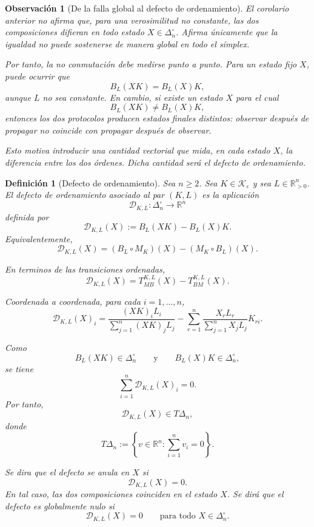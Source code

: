 \documentclass[12pt]{article}
\newtheorem{definicion}{Definición}[section]
\newtheorem{observacion}{Observación}[section]
\begin{document}
\begin{observacion}[De la falla global al defecto de ordenamiento]
El corolario anterior no afirma que, para una verosimilitud no constante, las dos composiciones difieran en todo estado \(X\in\Delta_n^\circ\). Afirma únicamente que la igualdad no puede sostenerse de manera global en todo el símplex.

Por tanto, la no conmutación debe medirse punto a punto. Para un estado fijo \(X\), puede ocurrir que
\[
B_L(XK)=B_L(X)K,
\]
aunque \(L\) no sea constante. En cambio, si existe un estado \(X\) para el cual
\[
B_L(XK)\neq B_L(X)K,
\]
entonces los dos protocolos producen estados finales distintos: observar después de propagar no coincide con propagar después de observar.

Esto motiva introducir una cantidad vectorial que mida, en cada estado \(X\), la diferencia entre los dos órdenes. Dicha cantidad será el defecto de ordenamiento.
\end{observacion}

\begin{definicion}[Defecto de ordenamiento]
\label{def:defecto_ordenamiento}
Sea \(n\ge 2\). Sea \(K\in\mathcal K_\varepsilon\) y sea \(L\in\mathbb R_{>0}^n\). El defecto de ordenamiento asociado al par \((K,L)\) es la aplicación
\[
\mathcal D_{K,L}:\Delta_n^\circ\longrightarrow \mathbb R^n
\]
definida por
\[
\mathcal D_{K,L}(X)
:=
B_L(XK)-B_L(X)K.
\]
Equivalentemente,
\[
\mathcal D_{K,L}(X)
=
(B_L\circ M_K)(X)
-
(M_K\circ B_L)(X).
\]

En terminos de las transiciones ordenadas,
\[
\mathcal D_{K,L}(X)
=
T_{MB}^{K,L}(X)-T_{BM}^{K,L}(X).
\]

Coordenada a coordenada, para cada \(i=1,\dots,n\),
\[
\mathcal D_{K,L}(X)_i
=
\frac{(XK)_iL_i}{\sum_{j=1}^n (XK)_jL_j}
-
\sum_{r=1}^n
\frac{X_rL_r}{\sum_{j=1}^n X_jL_j}K_{ri}.
\]

Como
\[
B_L(XK)\in\Delta_n^\circ
\qquad
\text{y}
\qquad
B_L(X)K\in\Delta_n^\circ,
\]
se tiene
\[
\sum_{i=1}^n \mathcal D_{K,L}(X)_i=0.
\]
Por tanto,
\[
\mathcal D_{K,L}(X)\in T\Delta_n,
\]
donde
\[
T\Delta_n
:=
\left\{
v\in\mathbb R^n:
\sum_{i=1}^n v_i=0
\right\}.
\]

Se dira que el defecto se anula en \(X\) si
\[
\mathcal D_{K,L}(X)=0.
\]
En tal caso, las dos composiciones coinciden en el estado \(X\). Se dirá que el defecto es globalmente nulo si
\[
\mathcal D_{K,L}(X)=0
\qquad
\text{para todo }X\in\Delta_n^\circ.
\]
\end{definicion}
\end{document}
